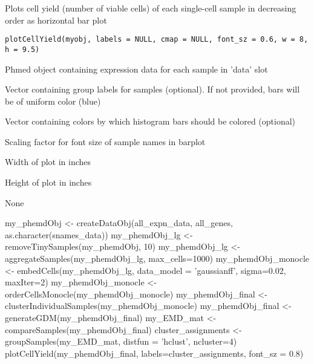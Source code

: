 \documentclass[a4paper]{book}
\begin{document}
%
\begin{Description}\relax
Plots cell yield (number of viable cells) of each single-cell sample in decreasing order as horizontal bar plot
\end{Description}
%
\begin{Usage}
\begin{verbatim}
plotCellYield(myobj, labels = NULL, cmap = NULL, font_sz = 0.6, w = 8, h = 9.5)
\end{verbatim}
\end{Usage}
%
\begin{Arguments}
\begin{ldescription}
\item[\code{myobj}] Phmed object containing expression data for each sample in 'data' slot

\item[\code{labels}] Vector containing group labels for samples (optional). If not provided, bars will be of uniform color (blue)

\item[\code{cmap}] Vector containing colors by which histogram bars should be colored (optional)

\item[\code{font\_sz}] Scaling factor for font size of sample names in barplot

\item[\code{w}] Width of plot in inches

\item[\code{h}] Height of plot in inches
\end{ldescription}
\end{Arguments}
%
\begin{Value}
None
\end{Value}
%
\begin{Examples}
\begin{ExampleCode}

my_phemdObj <- createDataObj(all_expn_data, all_genes, as.character(snames_data))
my_phemdObj_lg <- removeTinySamples(my_phemdObj, 10)
my_phemdObj_lg <- aggregateSamples(my_phemdObj_lg, max_cells=1000)
my_phemdObj_monocle <- embedCells(my_phemdObj_lg, data_model = 'gaussianff', sigma=0.02, maxIter=2)
my_phemdObj_monocle <- orderCellsMonocle(my_phemdObj_monocle)
my_phemdObj_final <- clusterIndividualSamples(my_phemdObj_monocle)
my_phemdObj_final <- generateGDM(my_phemdObj_final)
my_EMD_mat <- compareSamples(my_phemdObj_final)
cluster_assignments <- groupSamples(my_EMD_mat, distfun = 'hclust', ncluster=4)
plotCellYield(my_phemdObj_final, labels=cluster_assignments, font_sz = 0.8)

\end{ExampleCode}
\end{Examples}
\end{document}

